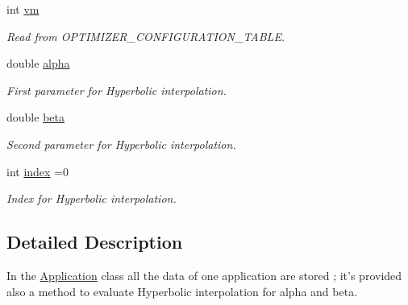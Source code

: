 \begin{DoxyCompactItemize}
int \hyperlink{classApplication_a0a3fe386eb8244e536bc5297709d1269}{vm}
\begin{DoxyCompactList}\small\item\em Read from O\-P\-T\-I\-M\-I\-Z\-E\-R\-\_\-\-C\-O\-N\-F\-I\-G\-U\-R\-A\-T\-I\-O\-N\-\_\-\-T\-A\-B\-L\-E. \end{DoxyCompactList}\item 
double \hyperlink{classApplication_a57e16d80835a1911b72c63d5eeb5d2f2}{alpha}
\begin{DoxyCompactList}\small\item\em First parameter for Hyperbolic interpolation. \end{DoxyCompactList}\item 
double \hyperlink{classApplication_a356ffae49ae223b3d98b57e56210e3a9}{beta}
\begin{DoxyCompactList}\small\item\em Second parameter for Hyperbolic interpolation. \end{DoxyCompactList}\item 
int \hyperlink{classApplication_ac3f0d1900b7ca640c270666d166db530}{index} =0
\begin{DoxyCompactList}\small\item\em Index for Hyperbolic interpolation. \end{DoxyCompactList}\end{DoxyCompactItemize}


\subsection{Detailed Description}
In the \hyperlink{classApplication}{Application} class all the data of one application are stored ; it's provided also a method to evaluate Hyperbolic interpolation for alpha and beta. 

